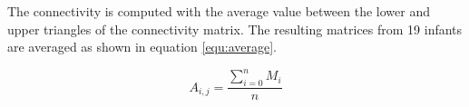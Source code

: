 \documentclass[]{spie}  %
\begin{document}
The connectivity is computed with the average value between the lower and upper triangles of the connectivity matrix.
The resulting matrices from 19 infants are averaged as shown in equation \ref{equ:average}.

\begin{equation}
	A_{i,j} = \frac{\sum_{i=0}^n M_i}{n}
	\label{equ:average}
\end{equation}



\begin{figure}
\centering 
{}

\end{figure}
\end{document}
